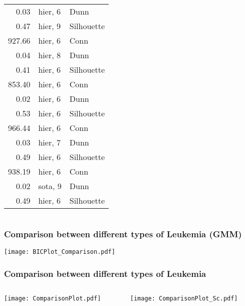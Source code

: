 \documentclass[10pt,dvipsnames,table, handout]{beamer} %
\begin{document}
\begin{frame}
\begin{columns}
\begin{column}{.5\textwidth}
\begin{table}[ht]
{\begin{tabular}{rll}
  0.03 & hier, 6 & Dunn \\ 
  0.47 & hier, 9 & Silhouette \\ 
  927.66 & hier, 6 & Conn \\ 
  0.04 & hier, 8 & Dunn \\ 
  0.41 & hier, 6 & Silhouette \\ 
  853.40 & hier, 6 & Conn \\ 
  0.02 & hier, 6 & Dunn \\ 
  0.53 & hier, 6 & Silhouette \\ 
  966.44 & hier, 6 & Conn \\ 
  0.03 & hier, 7 & Dunn \\ 
  0.49 & hier, 6 & Silhouette \\ 
  938.19 & hier, 6 & Conn \\ 
  0.02 & sota, 9 & Dunn \\ 
  0.49 & hier, 6 & Silhouette \\ 
   \hline
\end{tabular}
}
\end{table}
\end{column}
\end{columns}
\end{frame}

\begin{frame}
\frametitle{Comparison between different types of Leukemia (GMM)}
\begin{center}
\texttt{[image: BICPlot\_Comparison.pdf]} \\
\end{center}
\end{frame}

\begin{frame}
\frametitle{Comparison between different types of Leukemia}
\begin{columns}
\begin{column}{.5\textwidth}
\texttt{[image: ComparisonPlot.pdf]} \\
\end{column}
\begin{column}{.5\textwidth}
\texttt{[image: ComparisonPlot\_Sc.pdf]} \\
\end{column}
\end{columns}
\end{frame}
\end{document}
